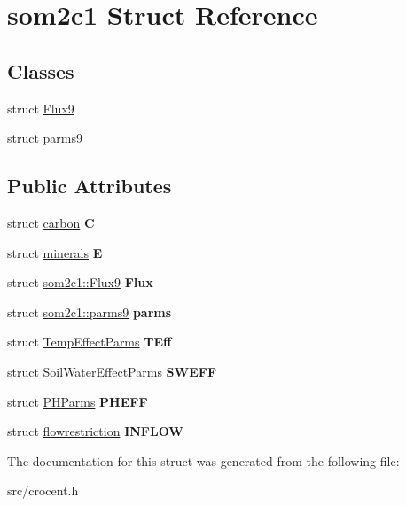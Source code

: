 \hypertarget{structsom2c1}{\section{som2c1 Struct Reference}
\label{structsom2c1}
}
\subsection*{Classes}
\begin{DoxyCompactItemize}
\item 
struct \hyperlink{structsom2c1_1_1_flux9}{Flux9}
\item 
struct \hyperlink{structsom2c1_1_1parms9}{parms9}
\end{DoxyCompactItemize}
\subsection*{Public Attributes}
\begin{DoxyCompactItemize}
\item 
\hypertarget{structsom2c1_a0ba04ad53f809d6d46dfe756c39604d5}{struct \hyperlink{structcarbon}{carbon} {\bfseries C}}\label{structsom2c1_a0ba04ad53f809d6d46dfe756c39604d5}

\item 
\hypertarget{structsom2c1_a69435a97289416a725fd15b58fbd3c0e}{struct \hyperlink{structminerals}{minerals} {\bfseries E}}\label{structsom2c1_a69435a97289416a725fd15b58fbd3c0e}

\item 
\hypertarget{structsom2c1_a219def817cb913e68007326654ce78b3}{struct \hyperlink{structsom2c1_1_1_flux9}{som2c1\-::\-Flux9} {\bfseries Flux}}\label{structsom2c1_a219def817cb913e68007326654ce78b3}

\item 
\hypertarget{structsom2c1_a8d13130e17734b4e858e63e4d64b2bdc}{struct \hyperlink{structsom2c1_1_1parms9}{som2c1\-::parms9} {\bfseries parms}}\label{structsom2c1_a8d13130e17734b4e858e63e4d64b2bdc}

\item 
\hypertarget{structsom2c1_a1eb5959504c475bfc1b11648fb781e4c}{struct \hyperlink{struct_temp_effect_parms}{Temp\-Effect\-Parms} {\bfseries T\-Eff}}\label{structsom2c1_a1eb5959504c475bfc1b11648fb781e4c}

\item 
\hypertarget{structsom2c1_acf800d34c0dece9f510ffa03b4b6d08f}{struct \hyperlink{struct_soil_water_effect_parms}{Soil\-Water\-Effect\-Parms} {\bfseries S\-W\-E\-F\-F}}\label{structsom2c1_acf800d34c0dece9f510ffa03b4b6d08f}

\item 
\hypertarget{structsom2c1_ab60aff00b6505ae0f9c4e08612c88ea4}{struct \hyperlink{struct_p_h_parms}{P\-H\-Parms} {\bfseries P\-H\-E\-F\-F}}\label{structsom2c1_ab60aff00b6505ae0f9c4e08612c88ea4}

\item 
\hypertarget{structsom2c1_aea156ed1eb6ee9b2463207a870a5eefb}{struct \hyperlink{structflowrestriction}{flowrestriction} {\bfseries I\-N\-F\-L\-O\-W}}\label{structsom2c1_aea156ed1eb6ee9b2463207a870a5eefb}

\end{DoxyCompactItemize}


The documentation for this struct was generated from the following file\-:\begin{DoxyCompactItemize}
\item 
src/crocent.\-h\end{DoxyCompactItemize}
